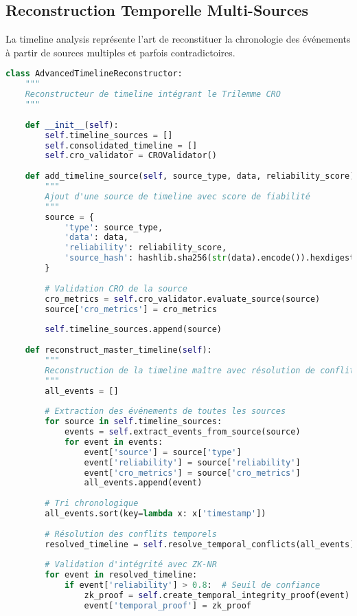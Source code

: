 \subsection{Reconstruction Temporelle Multi-Sources}

La timeline analysis représente l'art de reconstituer la chronologie des événements à partir de sources multiples et parfois contradictoires.

\begin{lstlisting}[language=Python, caption=Reconstructeur de timeline avec validation CRO]
class AdvancedTimelineReconstructor:
    """
    Reconstructeur de timeline intégrant le Trilemme CRO
    """
    
    def __init__(self):
        self.timeline_sources = []
        self.consolidated_timeline = []
        self.cro_validator = CROValidator()
        
    def add_timeline_source(self, source_type, data, reliability_score):
        """
        Ajout d'une source de timeline avec score de fiabilité
        """
        source = {
            'type': source_type,
            'data': data,
            'reliability': reliability_score,
            'source_hash': hashlib.sha256(str(data).encode()).hexdigest()
        }
        
        # Validation CRO de la source
        cro_metrics = self.cro_validator.evaluate_source(source)
        source['cro_metrics'] = cro_metrics
        
        self.timeline_sources.append(source)
        
    def reconstruct_master_timeline(self):
        """
        Reconstruction de la timeline maître avec résolution de conflits
        """
        all_events = []
        
        # Extraction des événements de toutes les sources
        for source in self.timeline_sources:
            events = self.extract_events_from_source(source)
            for event in events:
                event['source'] = source['type']
                event['reliability'] = source['reliability']
                event['cro_metrics'] = source['cro_metrics']
                all_events.append(event)
        
        # Tri chronologique
        all_events.sort(key=lambda x: x['timestamp'])
        
        # Résolution des conflits temporels
        resolved_timeline = self.resolve_temporal_conflicts(all_events)
        
        # Validation d'intégrité avec ZK-NR
        for event in resolved_timeline:
            if event['reliability'] > 0.8:  # Seuil de confiance
                zk_proof = self.create_temporal_integrity_proof(event)
                event['temporal_proof'] = zk_proof
                

\end{lstlisting}
